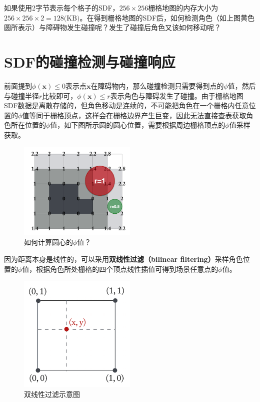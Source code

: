 如果使用2字节表示每个格子的SDF，\(256\times256\)栅格地图的内存大小为\(256 \times 256 \times 2 = 128\text{(KB)}\)。在得到栅格地图的SDF后，如何检测角色（如上图黄色圆所表示）与障碍物发生碰撞呢？发生了碰撞后角色又该如何移动呢？

\hypertarget{sdfux7684ux78b0ux649eux68c0ux6d4bux4e0eux78b0ux649eux54cdux5e94}{%
\section{SDF的碰撞检测与碰撞响应}\label{sdfux7684ux78b0ux649eux68c0ux6d4bux4e0eux78b0ux649eux54cdux5e94}}

前面提到\(\phi(\mathbf{x}) \leqslant 0\)表示点\(\mathbf{x}\)在障碍物内，那么碰撞检测只需要得到点的\(\phi\)值，然后与碰撞半径\(r\)比较即可，\(\phi(\mathbf{x}) \leqslant r\)表示角色与障碍发生了碰撞。由于栅格地图SDF数据是离散存储的，但角色移动是连续的，不可能把角色在一个栅格内任意位置的\(\phi\)值等同于栅格顶点，这样会在栅格边界产生巨变，因此无法直接查表获取角色所在位置的\(\phi\)值，如下图所示圆的圆心位置，需要根据周边栅格顶点的\(\phi\)值采样获取。

\begin{figure}
\centering
\includegraphics[width=0.5\textwidth,height=\textheight]{碰撞检测.png}
\caption{如何计算圆心的\(\phi\)值？}
\end{figure}

因为距离本身是线性的，可以采用\textbf{双线性过滤（bilinear
filtering）}采样角色位置的\(\phi\)值，根据角色所处栅格的四个顶点线性插值可得到场景任意点的\(\phi\)值。

\begin{figure}
\centering
\includegraphics[width=0.5\textwidth,height=\textheight]{双线性过滤示意图.png}
\caption{双线性过滤示意图}
\end{figure}

